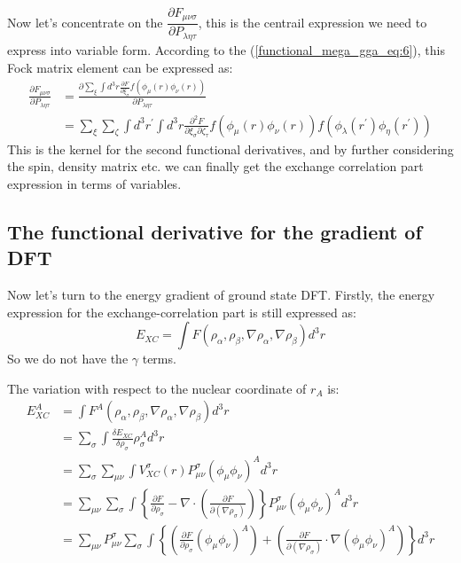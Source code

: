 Now let's concentrate on the $\dfrac{\partial
F_{\mu\nu\sigma}}{\partial P_{\lambda\eta\tau}}$, this is the
centrail expression we need to express into variable form.
According to the (\ref{functional_mega_gga_eq:6}), this Fock matrix
element can be expressed as:
\begin{equation}
\begin{split}
 \frac{\partial F_{\mu\nu\sigma}}{\partial P_{\lambda\eta\tau}}
&= 
\frac{\partial \sum_{\xi} \int d^{3}r 
\frac{\partial F}{\partial \xi_{\sigma}}
f(\phi_{\mu}(r)\phi_{\nu}(r))}
{\partial P_{\lambda\eta\tau}} \\
&=\sum_{\xi}\sum_{\zeta}\int d^{3} r^{'}\int d^{3}r 
\frac{\partial^{2} F}
{\partial \xi_{\sigma} \partial \zeta_{\tau}}
f(\phi_{\mu}(r)\phi_{\nu}(r))
f(\phi_{\lambda}(r^{'})\phi_{\eta}(r^{'}))
\end{split}
\end{equation}
This is the kernel for the second functional derivatives, and by
further considering the spin, density matrix etc. we can finally get
the exchange correlation part expression in terms of variables.

\subsection{The functional derivative for the gradient of DFT}
\label{Func_Deriv_gradient_variable_GGA}
%
%
%
%
%
Now let's turn to the energy gradient of ground state DFT. Firstly,
the energy expression for the exchange-correlation part is still
expressed as:
\begin{equation}
\label{NUCLEAR_GRADIENT_DFTeq:1}
 E_{XC} = \int F(\rho_{\alpha}, \rho_{\beta}, \nabla\rho_{\alpha},
\nabla\rho_{\beta})d^{3}r
\end{equation} 
So we do not have the $\gamma$ terms.

The variation with respect to the nuclear coordinate of $r_{A}$ is:
\begin{align}
\label{NUCLEAR_GRADIENT_DFTeq:2}
 E_{XC}^{A} &=  \int  F^{A}(\rho_{\alpha}, \rho_{\beta},
\nabla\rho_{\alpha},\nabla\rho_{\beta}) d^{3}r \nonumber \\
  &= \sum_{\sigma}\int  \frac{\delta E_{XC} }{\delta\rho_{\sigma}
}\rho_{\sigma}^{A} d^{3}r \nonumber \\
  &=  \sum_{\sigma}\sum_{\mu\nu}\int 
V^{\sigma}_{XC}(r)P_{\mu\nu}^{\sigma}(\phi_{\mu}\phi_{\nu
})^{A} d^{3}r \nonumber \\
  &=  \sum_{\mu\nu}\sum_{\sigma}\int\left\lbrace \frac{\partial F}
{\partial \rho_{\sigma}} - \nabla\cdot \left(
    \frac{\partial F}{\partial (\nabla\rho_{\sigma})}
  \right) \right\rbrace  P_{\mu\nu}^{\sigma}(\phi_{\mu}\phi_{\nu
})^{A} d^{3}r \nonumber \\
  &= \sum_{\mu\nu} P_{\mu\nu}^{\sigma}\sum_{\sigma}\int\left\lbrace
\left(
\frac{\partial F}{\partial \rho_{\sigma}}(\phi_{\mu}\phi_{\nu
})^{A}\right) + \left(
    \frac{\partial F}{\partial (\nabla\rho_{\sigma})}
    \cdotp\nabla(\phi_{\mu}\phi_{\nu
})^{A}\right)\right\rbrace  d^{3}r
\end{align}

